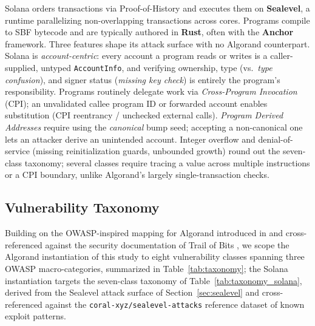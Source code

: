 \documentclass[lettersize,journal]{IEEEtran}
\begin{document}
Solana orders transactions via Proof-of-History and executes them on \textbf{Sealevel}, a runtime
parallelizing non-overlapping transactions across cores. Programs compile to SBF bytecode and are
typically authored in \textbf{Rust}, often with the \textbf{Anchor} framework. Three features shape
its attack surface with no Algorand counterpart. Solana is \emph{account-centric}: every account a
program reads or writes is a caller-supplied, untyped \texttt{AccountInfo}, and verifying ownership,
type (vs.\ \emph{type confusion}), and signer status (\emph{missing key check}) is entirely the
program's responsibility. Programs routinely delegate work via \emph{Cross-Program Invocation}
(CPI); an unvalidated callee program ID or forwarded account enables substitution (CPI reentrancy /
unchecked external calls). \emph{Program Derived Addresses} require using the \emph{canonical} bump
seed; accepting a non-canonical one lets an attacker derive an unintended account. Integer overflow
and denial-of-service (missing reinitialization guards, unbounded growth) round out the seven-class
taxonomy; several classes require tracing a value across multiple instructions or a CPI boundary,
unlike Algorand's largely single-transaction checks.

\subsection{Vulnerability Taxonomy}
\label{sec:taxonomy}

Building on the OWASP-inspired mapping for Algorand introduced in \cite{boi2025} and
cross-referenced against the security documentation of Trail of Bits \cite{trailofbits_algorand}, we
scope the Algorand instantiation of this study to eight vulnerability classes spanning three OWASP
macro-categories, summarized in Table~\ref{tab:taxonomy}; the Solana instantiation targets the
seven-class taxonomy of Table~\ref{tab:taxonomy_solana}, derived from the Sealevel attack surface of
Section~\ref{sec:sealevel} and cross-referenced against the \texttt{coral-xyz/sealevel-attacks}
\cite{sealevel_attacks} reference dataset of known exploit patterns.
\end{document}
